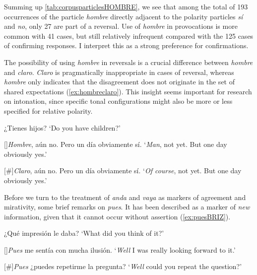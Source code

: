 Summing up \autoref{tab:corpusparticlesHOMBRE}, we see that among the total of 193 occurrences of the particle \textit{hombre} directly adjacent to the polarity particles \textit{sí} and \textit{no}, only 27 are part of a reversal. Use of \textit{hombre} in provocations is more common with 41 cases, but still relatively infrequent compared with the 125 cases of confirming responses. I interpret this as a strong preference for confirmations.

The possibility of using \textit{hombre} in reversals is a crucial difference between \textit{hombre} and \textit{claro}. \textit{Claro} is pragmatically inappropriate in cases of reversal, where\-as \textit{hombre} only indicates that the disagreement does not originate in the set of shared expectations (\ref{ex:hombreclaro}). This insight seems important for research on intonation, since specific tonal configurations might also be more or less specified for relative polarity.

	
\begin{exe}
	\ex \label{ex:hombreclaro} 
	\begin{xlist}[A:]
	 ¿Tienes hijos?
	\glt `Do you have children?'
	\end{xlist}
	\begin{xlist}\judgewidth{\#}
		\ex	 
		\begin{xlist}[B:]
			[]{\textit{Hombre}, aún no. Pero un día obviamente sí.
			\glt `\textit{Man}, not yet. But one day obviously yes.' }
		\end{xlist}
		\ex
		\begin{xlist}[B:]
			[\#]{\textit{Claro}, aún no. Pero un día obviamente sí.
						 \glt `\textit{Of course}, not yet. But one day obviously yes.'
					    }
	    \end{xlist}
	\end{xlist}	
\end{exe}

Before we turn to the treatment of \textit{anda} and \textit{vaya} as markers of agreement and mirativity, some brief remarks on \textit{pues}. It has been described as a marker of \textit{new} information, given that it cannot occur without assertion (\ref{ex:puesBRIZ}).\largerpage

\begin{exe}
	\ex \label{ex:puesBRIZ} \citep{PorrocheBallesteros.2011}
	\begin{xlist}[A:]
	 ¿Qué impresión le daba?
	\glt `What did you think of it?' 
	\end{xlist}
	\begin{xlist} \judgewidth{\#}
		\ex \begin{xlist}[B:]
			[]{\textit{Pues} me sentía con mucha ilusión.
					  \glt `\textit{Well} I was really looking forward to it.'}
	        \end{xlist}
		\ex	 \begin{xlist}[B:]
			[\#]{\textit{Pues} ¿puedes repetirme la pregunta?
						 \glt `\textit{Well} could you repeat the question?'}
			 \end{xlist}
	\end{xlist}
\end{exe}

